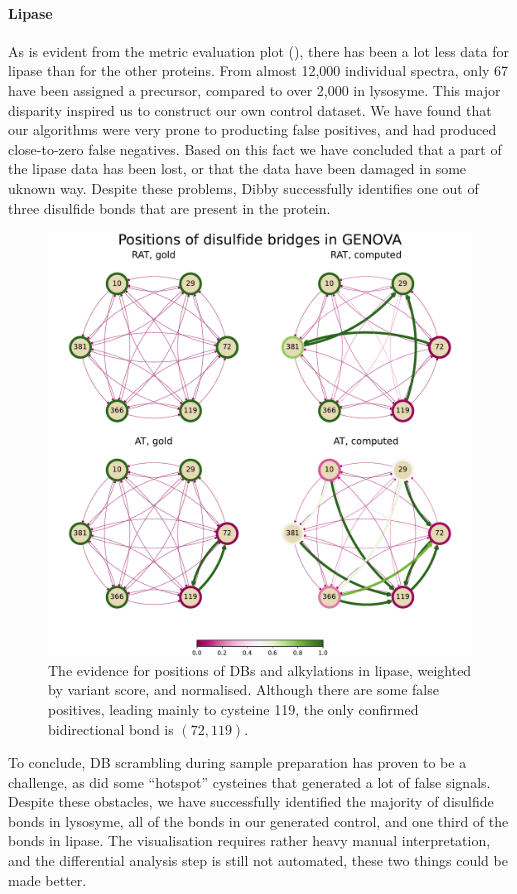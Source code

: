 
\paragraph{Lipase} As is evident from the metric evaluation plot (), there has been a lot less data for lipase than for the other proteins. From almost 12,000 individual spectra, only 67 have been assigned a precursor, compared to over 2,000 in lysosyme. This major disparity inspired us to construct our own control dataset. We have found that our algorithms were very prone to producting false positives, and had produced close-to-zero false negatives. Based on this fact we have concluded that a part of the lipase data has been lost, or that the data have been damaged in some uknown way. Despite these problems, Dibby successfully identifies one out of three disulfide bonds that are present in the protein.


\begin{figure}
  \centering
  \includegraphics[width=1\linewidth]{img/genova.pdf}
  \caption{The evidence for positions of DBs and alkylations in lipase, weighted by variant score, and normalised. Although there are some false positives, leading mainly to cysteine 119, the only confirmed bidirectional bond is \((72, 119)\). }\label{fig:genova}
\end{figure}

To conclude, DB scrambling during sample preparation has proven to be a challenge, as did some ``hotspot'' cysteines that generated a lot of false signals. Despite these obstacles, we have successfully identified the majority of disulfide bonds in lysosyme, all of the bonds in our generated control, and one third of the bonds in lipase. The visualisation requires rather heavy manual interpretation, and the differential analysis step is still not automated, these two things could be made better.
